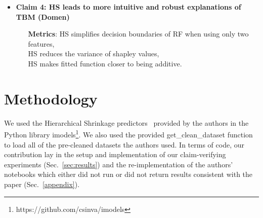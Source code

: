{\begin{itemize}[label={}]
\begin{itemize}[label={}, leftmargin=4.3em]
                                 likelihood that HS-RF runtime is shorter than RF-$d_{max}$, RF-$d_{mtry}$ and BART runtime evaluated using both (CPU and wall time).
    \end{itemize}
    \item \textbf{Claim 4: HS leads to more intuitive and robust explanations of TBM (Domen)}
    \vspace{-0.5em}
    \begin{itemize}[label={}, leftmargin=4.3em]
        \item[\textbf{Metrics}:] HS simplifies decision boundaries of RF when using only two features, \\
                                 HS reduces the variance of shapley values, \\
                                 HS makes fitted function closer to being additive.
    \end{itemize}
\end{itemize}
}



\section{Methodology}

We used the Hierarchical Shrinkage predictors~\cite{agarwal2022} provided by the authors in the Python library {\sf imodels}\footnote{https://github.com/csinva/imodels}. We also used the provided {\sf get\_clean\_dataset} function to load all of the pre-cleaned datasets the authors used. In terms of code, our contribution lay in the setup and implementation of our claim-verifying experiments (Sec.~\ref{sec:results}) and the re-im\-ple\-men\-ta\-tion of the authors' notebooks which either did not run or did not return results consistent with the paper (Sec.~\ref{appendix}).

